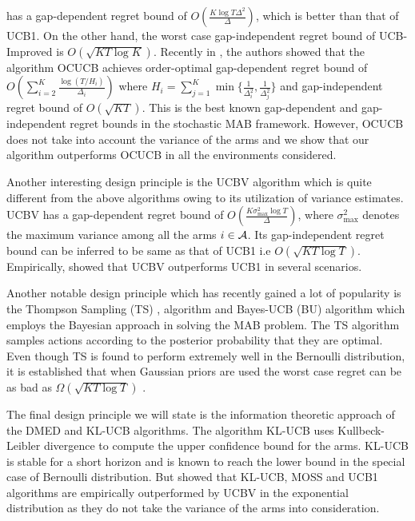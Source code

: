 has a gap-dependent regret bound of $O\left(\frac{K\log T\Delta^{2}}{\Delta}\right)$, which is better than that of UCB1. On the other hand, the worst case gap-independent regret bound of UCB-Improved is $O\left(\sqrt{KT\log K}\right)$. Recently in \citet{lattimore2015optimally}, the authors showed that  the algorithm OCUCB achieves order-optimal gap-dependent regret bound of $O\left(\sum_{i=2}^{K}\frac{\log\left(T/H_i\right)}{\Delta_i}\right)$ where $H_i=\sum_{j=1}^{K}\min\lbrace \frac{1}{\Delta_i^2},\frac{1}{\Delta_j^2}\rbrace$ and gap-independent regret bound of $O\left( \sqrt{KT}\right)$. This is the best known gap-dependent and gap-independent regret bounds in the stochastic MAB framework. However, OCUCB does not take into account the variance of the arms and we show that our algorithm outperforms OCUCB in all the environments considered. 

	Another interesting design principle is the UCBV \citep{audibert2009exploration} algorithm which is quite different  from the above algorithms owing to its utilization of variance estimates. UCBV has a gap-dependent regret bound of $O\left(\frac{K\sigma_{\max}^{2}\log T}{\Delta}\right)$, where $\sigma_{\max}^{2}$ denotes the maximum variance among all the arms $i\in \mathcal{A}$. Its gap-independent regret bound can be inferred to be same as that of UCB1 i.e $O \left(\sqrt{KT\log T}\right)$. Empirically, \citet{audibert2009exploration} showed that UCBV outperforms UCB1 in several scenarios. 
	
	Another notable design principle which has recently gained a lot of popularity is the Thompson Sampling (TS) \citep{thompson1933likelihood}, \citep{agrawal2011analysis} algorithm and Bayes-UCB (BU) algorithm \citep{kaufmann2012bayesian} which employs the Bayesian approach in solving the MAB problem. The TS algorithm samples actions according to the posterior probability that they are optimal. Even though TS is found to perform extremely well in the Bernoulli distribution, it is established that when Gaussian priors are used the worst case regret can be as bad as $\Omega \left( \sqrt{KT\log T}\right)$ \citep{lattimore2015optimally}.
	
	The final design principle we will state is the information theoretic approach of the DMED \citep{honda2010asymptotically} and KL-UCB \citep{garivier2011kl} algorithms. The algorithm KL-UCB uses Kullbeck-Leibler divergence to compute the upper confidence bound for the arms. KL-UCB is stable for a short horizon and is known to reach the \citet{lai1985asymptotically} lower bound in the special case of Bernoulli distribution. But \citet{garivier2011kl} showed that KL-UCB, MOSS and UCB1 algorithms are  empirically outperformed by UCBV in the exponential distribution as they do not take the variance of the arms into consideration. 